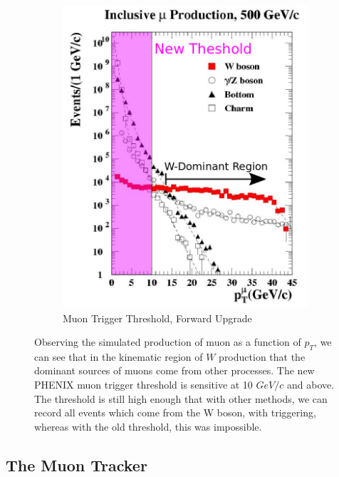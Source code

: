 \begin{figure}[ht]
\begin{subfigure}[b]{0.5\textwidth}
    \includegraphics[width=\textwidth]{./figures/w_dominant_region_new_trigger.png}
    \caption{Muon Trigger Threshold, Forward Upgrade}
    \label{fig:trig_muon_new}
  \end{subfigure}
  \caption{ 
    Observing the simulated production of muon as a function of $p_T$, we can
    see that in the kinematic region of $W$ production that the dominant sources
    of muons come from other processes. The new PHENIX muon trigger threshold is
    sensitive at 10 $GeV/c$ and above. The threshold is still high enough that
    with other methods, we can record all events which come from the W boson,
    with triggering, whereas with the old threshold, this was impossible.
  }
  \label{fig:muon_production_vs_pt}
\end{figure}

\subsection{The Muon Tracker}

